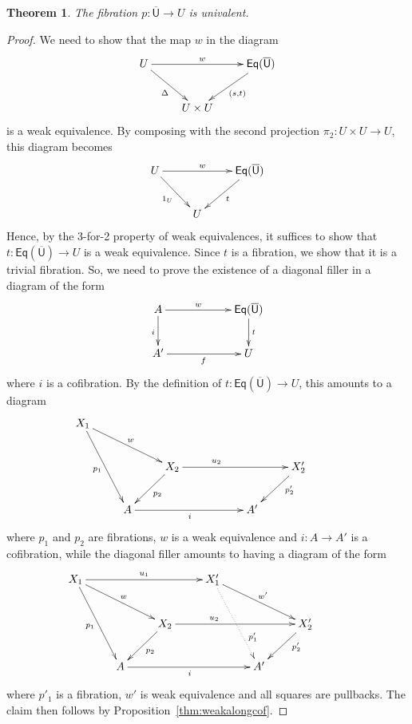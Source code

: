 \documentclass[reqno,10pt,a4paper,oneside]{amsart}
\newtheorem{theorem}{Theorem}[section]
\theoremstyle{definition}
\newcommand{\co}{\colon}
\newcommand{\UU}{\overline{\mathsf{U}}}
\newcommand{\Weq}{\mathsf{Eq}}
\begin{document}
\begin{theorem} The fibration  $p \co \UU \to U$ is univalent.
\end{theorem}

\begin{proof} We need to show that the map $w$ in the diagram
\[
\xymatrix{
U \ar[rr]^w \ar[dr]_{\Delta} & & \Weq(\UU) \ar[dl]^{(s,t)} \\
 & U \times U }
 \]
 is a weak equivalence.  By composing with the second projection $\pi_2 \co U \times U \to U$, this diagram
 becomes 
 \[
\xymatrix{
U \ar[rr]^w \ar[dr]_{1_U} & & \Weq(\UU) \ar[dl]^{t} \\
 & U  }
 \]
 Hence, by the 3-for-2 property of weak equivalences, it suffices to show that $t \co \Weq(\UU) \to U$ is
 a weak equivalence. Since $t$ is a fibration, we show that it is a trivial fibration. So, we need to prove
 the existence of a diagonal filler in a diagram of the form
 \begin{equation*}
 \xymatrix@C=2cm{
 A \ar[d]_i \ar[r]^-{w}  & \Weq(\UU) \ar[d]^t \\
 A' \ar[r]_{f} & U }
 \end{equation*}
where $i$ is a cofibration. By the definition of $t \co \Weq(\UU) \to U$, this amounts to a diagram
 \[
 \xymatrix{
 X_1 \ar[ddr]_{p_1}  \ar[drr]^{w}  &  & &  & & \\
  & & X_2 \ar[dl]^{p_2} \ar[rrr]^(.35){u_2} & & &  X_2' \ar[dl]^(.35){p'_2} \\
  & A \ar[rrr]_{i}  & & &A' & & }
  \]
  where $p_1$ and $p_2$ are fibrations, $w$ is a weak equivalence and $i \co A \to A'$ is a cofibration,  
  while the diagonal filler amounts to having a diagram of the form
 \[
 \xymatrix{
 X_1 \ar[ddr]_{p_1}  \ar[drr]^{w} \ar[rrr]^{u_1} &  & & X_1' \ar[drr]^{w'}  \ar@{.>}[ddr]^(.7){p_1'}  & & \\
  & & X_2 \ar[dl]^{p_2} \ar[rrr]^(.35){u_2} & & &  X_2' \ar[dl]^(.35){p'_2} \\
  & A \ar[rrr]_{i}  & & &A' & & }
  \]
where $p'_1$ is a fibration, $w'$ is weak equivalence and all squares are pullbacks. The claim then
follows by Proposition~\ref{thm:weakalongcof}.
 \end{proof} 
\end{document}
